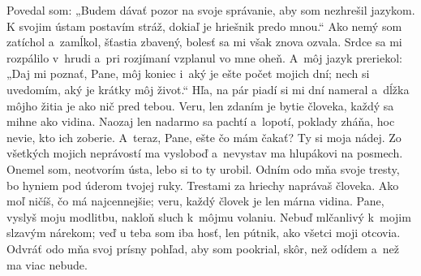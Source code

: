 Povedal som: „Budem dávať pozor na svoje správanie,
aby som nezhrešil jazykom.
\versseparator
K svojim ústam postavím stráž,
dokiaľ je hriešnik predo mnou.“
\versseparator
Ako nemý som zatíchol a~zamĺkol, šťastia zbavený,
bolesť sa mi však znova ozvala.
\versseparator
Srdce sa mi rozpálilo v~hrudi
a~pri rozjímaní vzplanul vo mne oheň.
\versseparator
A~môj jazyk preriekol:
„Daj mi poznať, Pane, môj koniec
\versseparator
 i~aký je ešte počet mojich dní;
nech si uvedomím, aký je krátky môj život.“
\versseparator
Hľa, na pár piadí si mi dní nameral
a~dĺžka môjho žitia je ako nič pred tebou.
\versseparator
Veru, len zdaním je bytie človeka,
každý sa mihne ako vidina.
\versseparator
Naozaj len nadarmo sa pachtí a~lopotí,
poklady zháňa, hoc nevie, kto ich zoberie.
\versseparator
A~teraz, Pane, ešte čo mám čakať?
Ty si moja nádej.
\versseparator
Zo všetkých mojich neprávostí ma vysloboď
a~nevystav ma hlupákovi na posmech.
\versseparator
Onemel som, neotvorím ústa,
lebo si to ty urobil.
Odním odo mňa svoje tresty,
\versseparator
bo hyniem pod úderom tvojej ruky.
Trestami za hriechy naprávaš človeka.
\versseparator
Ako moľ ničíš, čo má najcennejšie;
veru, každý človek je len márna vidina.
\versseparator
Pane, vyslyš moju modlitbu,
nakloň sluch k~môjmu volaniu.
\versseparator
Nebuď mlčanlivý k~mojim slzavým nárekom;
veď u teba som iba hosť,
len pútnik, ako všetci moji otcovia.
\versseparator
Odvráť odo mňa svoj prísny pohľad, aby som pookrial,
skôr, než odídem a~než ma viac nebude.